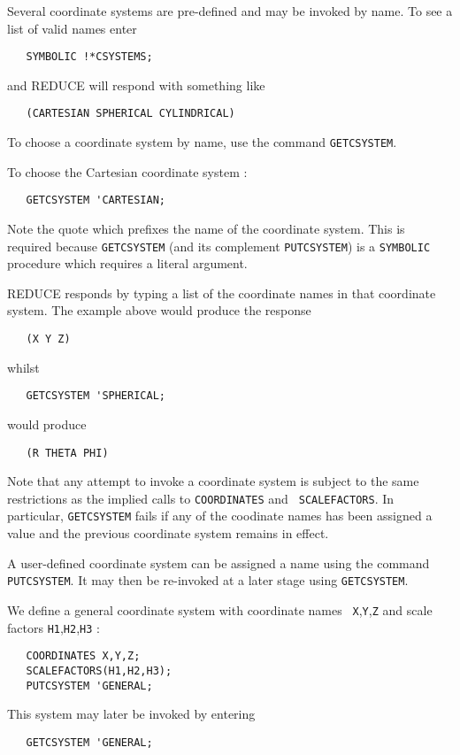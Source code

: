 Several coordinate systems are pre-defined and may be invoked by
name. To see a list of valid names enter
\begin{verbatim}
   SYMBOLIC !*CSYSTEMS;
\end{verbatim}
and REDUCE will respond with something like
\begin{verbatim}
   (CARTESIAN SPHERICAL CYLINDRICAL)
\end{verbatim}
To choose a coordinate system by name, use the command {\tt GETCSYSTEM}.


To choose the Cartesian coordinate system :
\begin{verbatim}
   GETCSYSTEM 'CARTESIAN;
\end{verbatim}
Note the quote which prefixes the name of the coordinate system. This
is required because {\tt GETCSYSTEM} (and its complement {\tt PUTCSYSTEM}) is a
{\tt SYMBOLIC} procedure which requires a literal argument.

REDUCE responds by typing a list of the coordinate names in that
coordinate system. The example above would produce the response
\begin{verbatim}
   (X Y Z)
\end{verbatim}
whilst
\begin{verbatim}
   GETCSYSTEM 'SPHERICAL;
\end{verbatim}
would produce
\begin{verbatim}
   (R THETA PHI)
\end{verbatim}

Note that any attempt to invoke a coordinate system is subject to the
same restrictions as the implied calls to {\tt COORDINATES} and {\tt
SCALEFACTORS}.  In particular, {\tt GETCSYSTEM} fails if any of the
coodinate names has been assigned a value and the previous coordinate
system remains in effect.

A user-defined coordinate system can be assigned a name using the
command {\tt PUTCSYSTEM}. It may then be re-invoked at a later stage using
{\tt GETCSYSTEM}.


We define a general coordinate system with coordinate names {\tt
X},{\tt Y},{\tt Z} and scale factors {\tt H1},{\tt H2},{\tt H3} :
\begin{verbatim}
   COORDINATES X,Y,Z;
   SCALEFACTORS(H1,H2,H3);
   PUTCSYSTEM 'GENERAL;
\end{verbatim}
This system may later be invoked by entering
\begin{verbatim}
   GETCSYSTEM 'GENERAL;
\end{verbatim}

